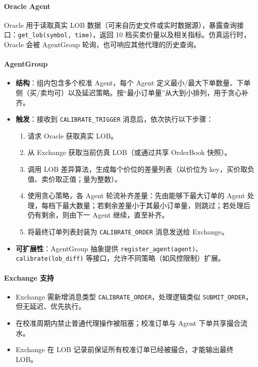\paragraph{Oracle Agent}
Oracle 用于读取真实 LOB 数据（可来自历史文件或实时数据源），暴露查询接口：\verb|get_lob(symbol, time)|，返回 10 档买卖价量以及相关指标。仿真运行时，Oracle 会被 AgentGroup 轮询，也可响应其他代理的历史查询。

\paragraph{AgentGroup}
\begin{itemize}
    \item \textbf{结构}：组内包含多个校准 Agent，每个 Agent 定义最小/最大下单数量、下单侧（买/卖均可）以及延迟策略。按“最小订单量”从大到小排列，用于贪心补齐。
    \item \textbf{触发}：接收到 \verb|CALIBRATE_TRIGGER| 消息后，依次执行以下步骤：
        \begin{enumerate}
            \item 请求 Oracle 获取真实 LOB。
            \item 从 Exchange 获取当前仿真 LOB（或通过共享 OrderBook 快照）。
            \item 调用 LOB 差异算法，生成每个价位的差量列表（以价位为 key，买价取负值、卖价取正值；量为整数）。
            \item 使用贪心策略，各 Agent 轮流补齐差量：先由能够下最大订单的 Agent 处理，每档下最大数量；若剩余差量小于其最小订单量，则跳过；若处理后仍有剩余，则由下一 Agent 继续，直至补齐。
            \item 将最终订单列表封装为 \verb|CALIBRATE_ORDER| 消息发送给 Exchange。
        \end{enumerate}
    \item \textbf{可扩展性}：AgentGroup 抽象提供 \verb|register_agent(agent)|、\verb|calibrate(lob_diff)| 等接口，允许不同策略（如风控限制）扩展。
\end{itemize}

\paragraph{Exchange 支持}
\begin{itemize}
    \item Exchange 需新增消息类型 \verb|CALIBRATE_ORDER|，处理逻辑类似 \verb|SUBMIT_ORDER|，但无延迟、优先执行。
    \item 在校准周期内禁止普通代理操作被阻塞；校准订单与 Agent 下单共享撮合流水。
    \item Exchange 在 LOB 记录前保证所有校准订单已经被撮合，才能输出最终 LOB。
\end{itemize}

